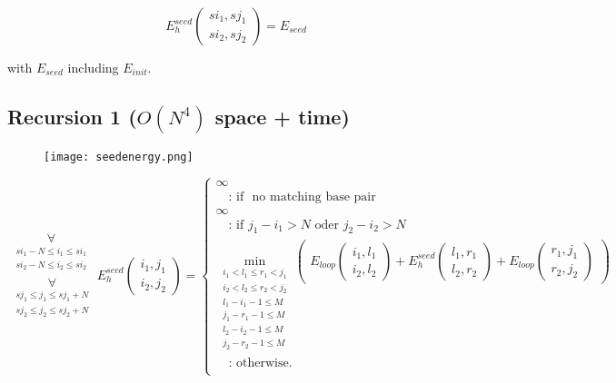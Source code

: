 \begin{equation*}
E_{h}^{seed}(\substack{si_1,sj_1\\si_2,sj_2}) = E_{seed}
\end{equation*}

with $E_{seed}$ including $E_{init}$.

\clearpage

\subsection{Recursion 1 ($O(N^{4})$ space + time)}

\begin{figure}[H]
	\centering
	\texttt{[image: seedenergy.png]}
\end{figure}

\begin{equation*}
\substack{
  \underset{\substack{si_{1}-N \le i_{1} \le si_{1}\\si_{2}-N \le i_{2} \le si_{2}}}{\forall}\\
  \underset{\substack{sj_{1} \le j_{1} \le sj_{1}+N\\sj_{2} \le j_{2} \le sj_{2}+N}}{\forall}
}
E_{h}^{seed}(\substack{i_1,j_1\\i_2,j_2}) = \begin{cases}
  \infty\\
  \quad\text{: if } \text{ no matching base pair }\\
  \infty\\
  \quad\text{: if } j_{1} - i_{1} > N \text{ oder } j_{2} - i_{2} > N\\
  \min\limits_{\substack{i_{1} < l_{1} \le r_{1} < j_{1}\\i_{2} < l_{2} \le r_{2} < j_{2}\\l_{1} - i_{1} - 1 \le M\\j_{1}-r_{1}-1 \le M\\l_{2} - i_{2} - 1 \le M\\j_{2}-r_{2}-1 \le M}}
  \begin{pmatrix}
	E_{loop}(\substack{i_1,l_1\\i_2,l_2}) + E_{h}^{seed}(\substack{l_1,r_1\\l_2,r_2}) + E_{loop}(\substack{r_1,j_1\\r_2,j_2})
  \end{pmatrix}\\
  \quad\text{: otherwise.}\\
  
\end{cases}
\end{equation*}

